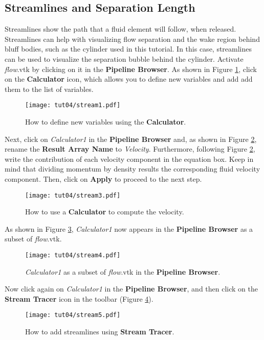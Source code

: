 \subsection{Streamlines and Separation Length}
Streamlines show the path that a fluid element will follow, when released. Streamlines can help with visualizing flow separation and the wake region behind bluff bodies, such as the cylinder used in this tutorial. In this case, streamlines can be used to visualize the separation bubble behind the cylinder. Activate \textit{flow}.vtk by clicking on it in the \textbf{Pipeline Browser}. As shown in Figure \ref{fig4:stream1_4}, click on the \textbf{Calculator} icon, which allows you to define new variables and add add them to the list of variables.
\begin{figure}[htbp]
    \centering
    \texttt{[image: tut04/stream1.pdf]}
    \caption{How to define new variables using the \textbf{Calculator}.}
    \label{fig4:stream1_4}
\end{figure}
Next, click on \textit{Calculator1} in the \textbf{Pipeline Browser} and, as shown in Figure \ref{fig4:stream3_4}, rename the \textbf{Result Array Name} to \textit{Velocity}. Furthermore, following Figure \ref{fig4:stream3_4}, write the contribution of each velocity component in the equation box. Keep in mind that dividing momentum by density results the corresponding fluid velocity component. Then, click on \textbf{Apply} to proceed to the next step.
\begin{figure}[htbp]
    \centering
    \texttt{[image: tut04/stream3.pdf]}
    \caption{How to use a \textbf{Calculator} to compute the velocity.}
    \label{fig4:stream3_4}
\end{figure}
As shown in Figure \ref{fig4:stream4_4}, \textit{Calculator1} now appears in the \textbf{Pipeline Browser} as a subset of \textit{flow}.vtk.
\begin{figure}[htbp]
    \centering
    \texttt{[image: tut04/stream4.pdf]}
    \caption{\textit{Calculator1} as a subset of \textit{flow}.vtk in the \textbf{Pipeline Browser}.}
    \label{fig4:stream4_4}
\end{figure}
Now click again on \textit{Calculator1} in the \textbf{Pipeline Browser}, and then click on the \textbf{Stream Tracer} icon in the toolbar (Figure \ref{fig4:stream5_4}).
\begin{figure}[htbp]
    \centering
    \texttt{[image: tut04/stream5.pdf]}
    \caption{How to add streamlines using \textbf{Stream Tracer}.}
    \label{fig4:stream5_4}
\end{figure}
